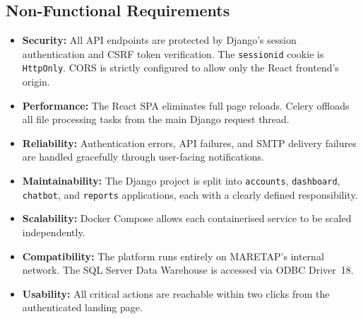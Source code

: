 \begin{sloppypar}
\subsection{Non-Functional Requirements}

\begin{itemize}
  \item \textbf{Security:} All API endpoints are protected by Django's session
    authentication and CSRF token verification. The \texttt{sessionid} cookie is
    \texttt{HttpOnly}. CORS is strictly configured to allow only the React
    frontend's origin.

  \item \textbf{Performance:} The React SPA eliminates full page reloads.
    Celery offloads all file processing tasks from the main Django request
    thread.

  \item \textbf{Reliability:} Authentication errors, API failures, and SMTP
    delivery failures are handled gracefully through user-facing notifications.

  \item \textbf{Maintainability:} The Django project is split into
    \texttt{accounts}, \texttt{dashboard}, \texttt{chatbot}, and
    \texttt{reports} applications, each with a clearly defined
    responsibility.

  \item \textbf{Scalability:} Docker Compose allows each containerised service
    to be scaled independently.

  \item \textbf{Compatibility:} The platform runs entirely on MARETAP's
    internal network. The SQL Server Data Warehouse is accessed via ODBC
    Driver~18.

  \item \textbf{Usability:} All critical actions are reachable within two
    clicks from the authenticated landing page.
\end{itemize}

\end{sloppypar}

